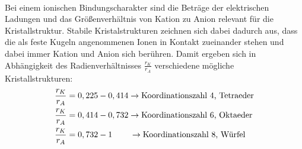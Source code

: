 \documentclass[11pt,a4paper]{article}
\numberwithin{equation}{section}
\numberwithin{figure}{section}
\begin{document}
\\
\begin{addmargin}[25pt]{0pt}
Bei einem ionischen Bindungscharakter sind die Beträge der elektrischen Ladungen und das Größenverhältnis von Kation zu Anion relevant für die Kristallstruktur. Stabile Kristalstrukturen zeichnen sich dabei dadurch aus, dass die als feste Kugeln angenommenen Ionen in Kontakt zueinander stehen und dabei immer Kation und Anion sich berühren. Damit ergeben sich in Abhängigkeit des Radienverhältnisses $\frac{r_K}{r_A}$ verschiedene mögliche Kristallstrukturen:
\begin{align*}
    \frac{r_K}{r_A} &= 0,225-0,414 \rightarrow \text{Koordinationszahl 4, Tetraeder}\\
    \frac{r_K}{r_A} &= 0,414-0,732 \rightarrow \text{Koordinationszahl 6, Oktaeder}\\
    \frac{r_K}{r_A} &= 0,732-1     \hspace{0.75cm}\rightarrow \text{Koordinationszahl 8, Würfel}
\end{align*}\\
\end{addmargin}
\end{document}
